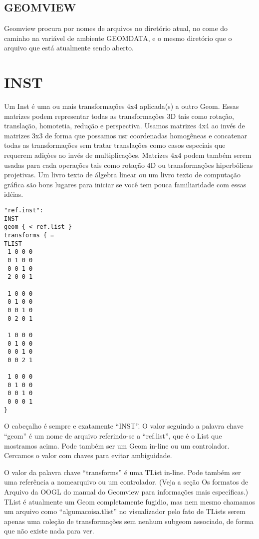 \documentclass[12pt,a4paper]{book}
\begin{document}
\section{GEOMVIEW}
Geomview procura por nomes de arquivos no diretório atual, no come do caminho na
variável de ambiente GEOMDATA, e o mesmo diretório que o arquivo
que está atualmente sendo aberto. 

\chapter{INST}

Um Inst é uma ou mais transformações 4x4 aplicada(s) a outro Geom.  Essas
matrizes podem representar todas as transformações 3D tais como rotação,
translação, homotetia, redução e perspectiva.  Usamos matrizes 4x4
ao invés de matrizes 3x3 de forma que possamos usr coordenadas homogêneas e
concatenar todas as transformações sem tratar translações como
casos especiais que requerem adiçòes ao invés de multiplicações.  Matrizes
4x4 podem também serem usadas para cada operações tais como rotação 4D ou
transformações hiperbólicas projetivas. Um livro texto de álgebra linear ou um livro texto de
computação gráfica são bons lugares para iniciar se você tem pouca familiaridade com
essas idéias.
\begin{verbatim}
"ref.inst":
INST
geom { < ref.list }
transforms { = 
TLIST
 1 0 0 0
 0 1 0 0
 0 0 1 0
 2 0 0 1

 1 0 0 0
 0 1 0 0
 0 0 1 0
 0 2 0 1

 1 0 0 0
 0 1 0 0
 0 0 1 0
 0 0 2 1

 1 0 0 0
 0 1 0 0
 0 0 1 0
 0 0 0 1
}
\end{verbatim}

O cabeçalho é sempre e exatamente ``INST''. O valor seguindo a palavra chave
``geom'' é um nome de arquivo referindo-se a ``ref.list'', que é o List que
mostramos acima.  Pode também ser um Geom in-line ou um controlador. Cercamos
o valor com chaves para evitar ambiguidade.

O valor da palavra chave ``transforms'' é uma TList in-line. Pode
também ser uma referência a nomearquivo ou um controlador. (Veja a seção Os formatos de
Arquivo da OOGL do manual do Geomview para informações mais específicas.) TList é atualmente um
Geom completamente fugidio, mas nem mesmo chamamos um arquivo como ``algumacoisa.tlist'' no
visualizador pelo fato de TLists serem apenas uma coleção de transformações sem nenhum
subgeom associado, de forma que não existe nada para ver.
\end{document}

